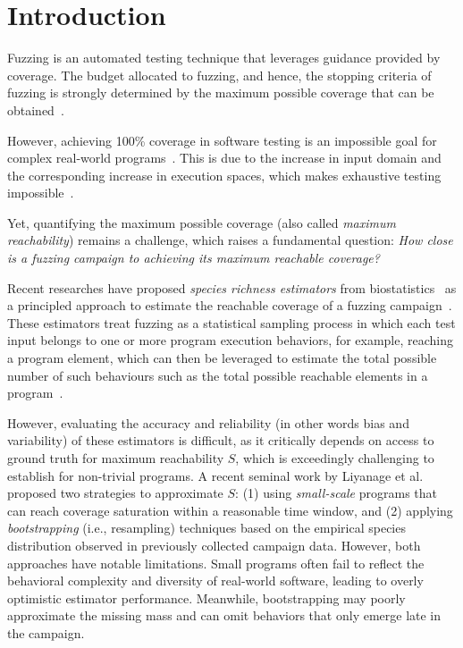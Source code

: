 \documentclass[conference]{IEEEtran}
\begin{document}
\section{Introduction}
Fuzzing is an automated testing technique that leverages guidance provided
by coverage. The budget allocated to fuzzing, and hence, the stopping criteria
of fuzzing is strongly determined by the maximum possible coverage that can
be obtained~\cite{fell2017review}.

However, achieving 100\% coverage in software testing is an impossible goal for
complex real-world programs~\cite{horgan1994achieving}.
This is due to the increase in input domain and the corresponding
increase in execution spaces, which makes exhaustive testing
impossible~\cite{knight1996exhaustive}.

Yet, quantifying the maximum possible coverage (also called \emph{maximum reachability})
remains a challenge, which raises a fundamental question:
\emph{How close is a fuzzing campaign to achieving its maximum reachable coverage?}

Recent researches have proposed \emph{species richness estimators} from
biostatistics~\cite{chao2016species} as a principled approach to estimate
the reachable coverage of a fuzzing campaign~\cite{reachability_2023,stads}.
These estimators treat fuzzing as a statistical sampling process in which
each test input belongs to one or more program execution behaviors,
for example, reaching a program element, which can then be leveraged to
estimate the total possible number of such behaviours such as the total
possible reachable elements in a program~\cite{stads,reachability_2023}.


However, evaluating the accuracy and reliability (in other words bias and variability) of these estimators is difficult, as it critically depends on access to ground truth for maximum reachability $S$, which is exceedingly challenging to establish for non-trivial programs. A recent seminal work by Liyanage et al.~\cite{reachability_2023} proposed two strategies to approximate $S$: (1) using \emph{small-scale} programs that can reach coverage saturation within a reasonable time window, and (2) applying \emph{bootstrapping} (i.e., resampling) techniques based on the empirical species distribution observed in previously collected campaign data. However, both approaches have notable limitations. Small programs often fail to reflect the behavioral complexity and diversity of real-world software, leading to overly optimistic estimator performance. Meanwhile, bootstrapping may poorly approximate the missing mass \cite{residual2021} and can omit behaviors that only emerge late in the campaign.
\end{document}
